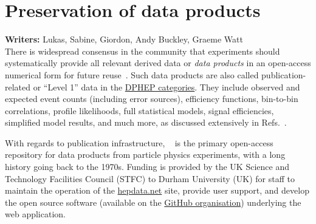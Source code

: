 \documentclass[11pt]{article}
\begin{document}
\section{Preservation of data products}
\label{data-products}

\noindent\textbf{Writers:} Lukas, Sabine, Giordon, Andy Buckley, Graeme Watt \\

There is widespread consensus in the community that experiments should systematically provide all relevant derived data or \emph{data products} in an open-access numerical form for future reuse~\cite{LHCReinterpretationForum:2020xtr}. 
Such data products are also called publication-related or ``Level 1'' data in the 
\href{https://opendata.cern.ch/docs/about}{DPHEP categories}. 
They include observed and expected event counts  (including error sources), efficiency functions,  bin-to-bin correlations, profile likelihoods, full statistical models, signal efficiencies, simplified model results, and much more, 
as discussed extensively in Refs.~\cite{LHCReinterpretationForum:2020xtr,Cranmer:2021urp}.

With regards to publication infrastructure, 
\hepdata~\cite{hepdata} is the primary open-access repository for %
data products from particle physics experiments, with a long history going back to the 1970s.
Funding is provided by the UK Science and Technology Facilities Council (STFC) to Durham University (UK) for staff to maintain the operation of the \href{https://www.hepdata.net/}{hepdata.net} site, provide user support, and develop the open source software (available on the \href{https://github.com/HEPData}{\hepdata GitHub organisation}) underlying the web application.
\end{document}
